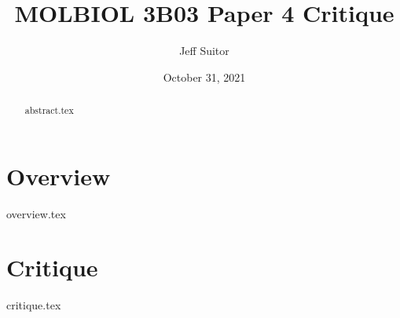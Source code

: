 \documentclass{amsart}
\title{MOLBIOL 3B03 Paper 4 Critique}
\author{Jeff Suitor}
\date{October 31, 2021}
\begin{document}
\begin{abstract}
    {abstract.tex}
\end{abstract}

\maketitle

\newpage

\section{Overview}
    {overview.tex}

\section{Critique}
    {critique.tex}

\begin{thebibliography}{99}

\end{thebibliography}
\end{document}
